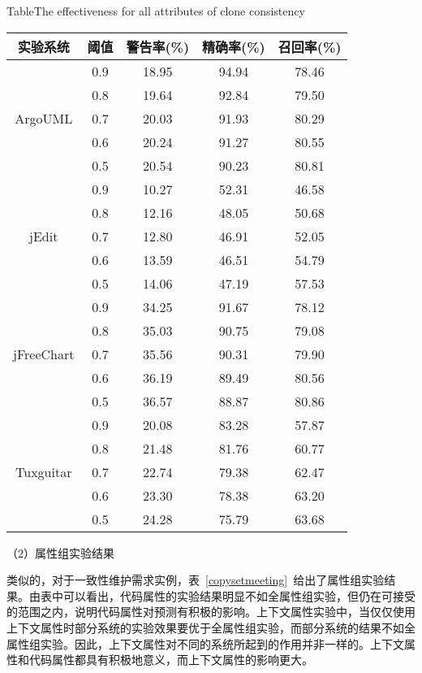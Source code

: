 \begin{table}[htbp]
{Table$\!$}{The effectiveness for all attributes of clone consistency}
\vspace{0.5em}
\centering
\wuhao
\begin{tabular}{ccccc}
\toprule[1.5pt]
{实验系统}&{阈值}&{警告率(\%)}&{精确率(\%)}&{召回率(\%)}\\
\midrule[1pt]
\multirow{5}{*}{ArgoUML}
&0.9&	18.95&	94.94&	78.46\\
&0.8&	19.64&	92.84&	79.50\\
&0.7&	20.03&	91.93&	80.29\\
&0.6&	20.24&	91.27&	80.55\\
&0.5&	20.54&	90.23&	80.81\\
\hline
\multirow{5}{*}{jEdit}
&0.9&	10.27&	52.31&	46.58\\
&0.8&	12.16&	48.05&	50.68\\
&0.7&	12.80&	46.91&	52.05\\
&0.6&	13.59&	46.51&	54.79\\
&0.5&	14.06&	47.19&	57.53\\
\hline
\multirow{5}{*}{jFreeChart}
&0.9&	34.25&	91.67&	78.12\\
&0.8&	35.03&	90.75&	79.08\\
&0.7&	35.56&	90.31&	79.90\\
&0.6&	36.19&	89.49&	80.56\\
&0.5&	36.57&	88.87&	80.86\\
\hline
\multirow{5}{*}{Tuxguitar}
&0.9&	20.08&	83.28&	57.87\\
&0.8&	21.48&	81.76&	60.77\\
&0.7&	22.74&	79.38&	62.47\\
&0.6&	23.30&	78.38&	63.20\\
&0.5&	24.28&	75.79&	63.68\\
\bottomrule[1.5pt]
\end{tabular}
\end{table}

（2）属性组实验结果

类似的，对于一致性维护需求实例，表~\ref{copysetmeeting}~给出了属性组实验结果。由表中可以看出，代码属性的实验结果明显不如全属性组实验，但仍在可接受的范围之内，说明代码属性对预测有积极的影响。上下文属性实验中，当仅仅使用上下文属性时部分系统的实验效果要优于全属性组实验，而部分系统的结果不如全属性组实验。因此，上下文属性对不同的系统所起到的作用并非一样的。上下文属性和代码属性都具有积极地意义，而上下文属性的影响更大。

